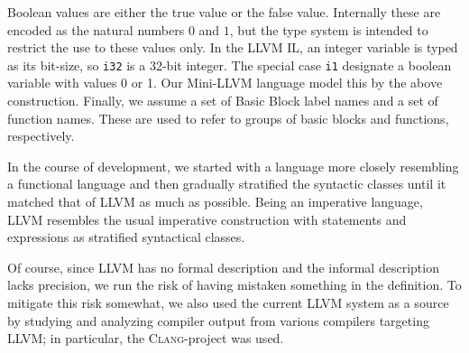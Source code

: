 \documentclass[a4paper, oneside, 10pt, draft]{memoir}
\newcommand{\clang}{\textsc{Clang}}
\begin{document}
Boolean values are either the true value or the false
value. Internally these are encoded as the natural numbers $0$ and
$1$, but the type system is intended to restrict the use to these
values only. In the LLVM IL, an integer variable is typed as its
bit-size, so \texttt{i32} is a 32-bit integer. The special case
\texttt{i1} designate a boolean variable with values 0 or 1. Our
Mini-LLVM language model this by the above construction. Finally, we
assume a set of Basic Block label names and a set of function
names. These are used to refer to groups of basic blocks and
functions, respectively.

In the course of development, we started with a language more closely
resembling a functional language and then gradually stratified the
syntactic classes until it matched that of LLVM as much as
possible. Being an imperative language, LLVM resembles the usual
imperative construction with statements and expressions as stratified
syntactical classes.

Of course, since LLVM has no formal description and the informal
description lacks precision\cite{lattner.ea:2009:llvm-ref}, we run the
risk of having mistaken something in the definition. To mitigate this
risk somewhat, we also used the current LLVM system as a source by
studying and analyzing compiler output from various compilers
targeting LLVM; in particular, the \clang{}-project was used.

\newcommand{\registers}{\mathrm{Registers}}
\newcommand{\constants}{\mathrm{Constants}}
\newcommand{\operations}{\mathrm{Operations}}
\newcommand{\instructions}{\mathrm{Instructions}}
\newcommand{\programs}{\mathrm{Programs}}
\newcommand{\definitions}{\mathrm{Definitions}}
\newcommand{\basicblocks}{\mathrm{Basic Blocks}}
\newcommand{\iret}[1]{\mathbf{ret} \; #1}
\end{document}

